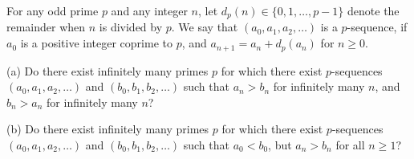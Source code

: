 For any odd prime $p$ and any integer $n$, let $d_p(n) \in \{0, 1, \ldots, p-1\}$ denote the remainder when $n$ is divided by $p$. We say that $(a_0, a_1, a_2, \ldots)$ is a $p$-sequence, if $a_0$ is a positive integer coprime to $p$, and $a_{n+1} = a_n + d_p(a_n)$ for $n \geq 0$.

(a) Do there exist infinitely many primes $p$ for which there exist $p$-sequences $(a_0, a_1, a_2, \ldots)$ and $(b_0, b_1, b_2, \ldots)$ such that $a_n > b_n$ for infinitely many $n$, and $b_n > a_n$ for infinitely many $n$?

(b) Do there exist infinitely many primes $p$ for which there exist $p$-sequences $(a_0, a_1, a_2, \ldots)$ and $(b_0, b_1, b_2, \ldots)$ such that $a_0 < b_0$, but $a_n > b_n$ for all $n \geq 1$?
